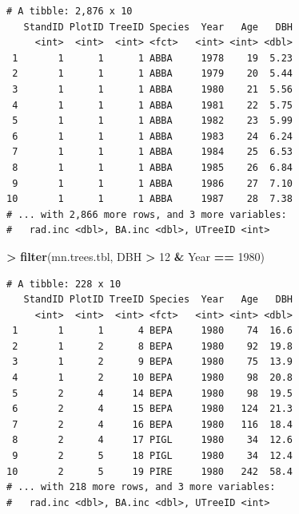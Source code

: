 \documentclass[]{krantz}
\makeatletter
\newenvironment{Shaded}{\begin{snugshade}}{\end{snugshade}}
\newcommand{\DecValTok}[1]{\textcolor[rgb]{0.06,0.06,0.06}{#1}}
\newcommand{\KeywordTok}[1]{\textcolor[rgb]{0.27,0.27,0.27}{\textbf{#1}}}
\newcommand{\NormalTok}[1]{#1}
\newcommand{\OperatorTok}[1]{\textcolor[rgb]{0.43,0.43,0.43}{\textbf{#1}}}
\newcommand{\StringTok}[1]{\textcolor[rgb]{0.5,0.5,0.5}{#1}}
\newenvironment{kframe}{%
\medskip{}
\setlength{\fboxsep}{.8em}
 \def\at@end@of@kframe{}%
 \ifinner\ifhmode%
  \def\at@end@of@kframe{\end{minipage}}%
  \begin{minipage}{\columnwidth}%
 \fi\fi%
 \def\FrameCommand##1{\hskip\@totalleftmargin \hskip-\fboxsep
 \colorbox{shadecolor}{##1}\hskip-\fboxsep
     \hskip-\linewidth \hskip-\@totalleftmargin \hskip\columnwidth}%
 \MakeFramed {\advance\hsize-\width
   \@totalleftmargin\z@ \linewidth\hsize
   \@setminipage}}%
 {\par\unskip\endMakeFramed%
 \at@end@of@kframe}
\renewenvironment{Shaded}{\begin{kframe}}{\end{kframe}}
\makeatother
\begin{document}
\begin{Shaded}
\end{Shaded}

\begin{verbatim}
# A tibble: 2,876 x 10
   StandID PlotID TreeID Species  Year   Age   DBH
     <int>  <int>  <int> <fct>   <int> <int> <dbl>
 1       1      1      1 ABBA     1978    19  5.23
 2       1      1      1 ABBA     1979    20  5.44
 3       1      1      1 ABBA     1980    21  5.56
 4       1      1      1 ABBA     1981    22  5.75
 5       1      1      1 ABBA     1982    23  5.99
 6       1      1      1 ABBA     1983    24  6.24
 7       1      1      1 ABBA     1984    25  6.53
 8       1      1      1 ABBA     1985    26  6.84
 9       1      1      1 ABBA     1986    27  7.10
10       1      1      1 ABBA     1987    28  7.38
# ... with 2,866 more rows, and 3 more variables:
#   rad.inc <dbl>, BA.inc <dbl>, UTreeID <int>
\end{verbatim}

\begin{Shaded}
\begin{Highlighting}[]
\OperatorTok{>}\StringTok{ }\KeywordTok{filter}\NormalTok{(mn.trees.tbl, DBH }\OperatorTok{>}\StringTok{ }\DecValTok{12} \OperatorTok{&}\StringTok{ }\NormalTok{Year }\OperatorTok{==}\StringTok{ }\DecValTok{1980}\NormalTok{)}
\end{Highlighting}
\end{Shaded}

\begin{verbatim}
# A tibble: 228 x 10
   StandID PlotID TreeID Species  Year   Age   DBH
     <int>  <int>  <int> <fct>   <int> <int> <dbl>
 1       1      1      4 BEPA     1980    74  16.6
 2       1      2      8 BEPA     1980    92  19.8
 3       1      2      9 BEPA     1980    75  13.9
 4       1      2     10 BEPA     1980    98  20.8
 5       2      4     14 BEPA     1980    98  19.5
 6       2      4     15 BEPA     1980   124  21.3
 7       2      4     16 BEPA     1980   116  18.4
 8       2      4     17 PIGL     1980    34  12.6
 9       2      5     18 PIGL     1980    34  12.4
10       2      5     19 PIRE     1980   242  58.4
# ... with 218 more rows, and 3 more variables:
#   rad.inc <dbl>, BA.inc <dbl>, UTreeID <int>
\end{verbatim}
\end{document}
